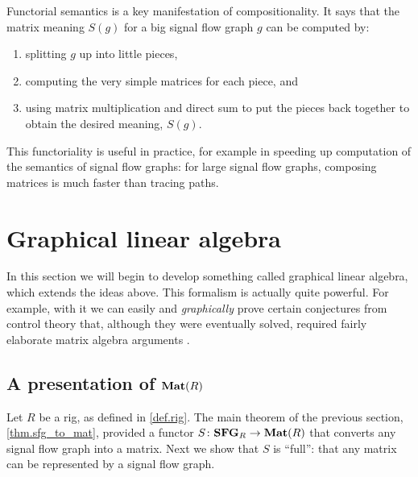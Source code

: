 \documentclass[7Sketches]{subfiles}
\begin{document}
Functorial semantics is a key manifestation of compositionality. It says that
the matrix meaning $S(g)$ for a big signal flow graph $g$ can be computed by:
\begin{enumerate}
	\item splitting $g$ up into little pieces,
	\item computing the very simple matrices for each piece, and
	\item using matrix multiplication and direct sum to put the pieces back together to obtain the desired meaning, $S(g)$.
\end{enumerate}
This functoriality is useful in practice, for example in
speeding up computation of the semantics of signal flow graphs: for large signal
flow graphs, composing matrices is much faster than tracing paths.

\section{Graphical linear algebra}

In this section we will begin to develop something called graphical linear
algebra, which extends the ideas above. This formalism is actually quite
powerful. For example, with it we can easily and \emph{graphically} prove
certain conjectures from control theory that, although they were eventually
solved, required fairly elaborate matrix algebra arguments
\cite{Fong.Sobocinski.Rapisardo:2016a}.

\subsection{A presentation of $\mathbf{Mat}(R)$}%

Let $R$ be a rig, as defined in \cref{def.rig}. The main theorem of the previous section, \cref{thm.sfg_to_mat}, provided a functor $S\colon \mathbf{SFG}_R \to \mathbf{Mat}(R)$ that converts any signal flow graph into a matrix. Next we show that $S$ is ``full'': that any matrix can be represented by a signal flow graph. 
\end{document}
